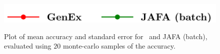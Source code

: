 \documentclass[letterpaper]{article}
\begin{document}
\begin{figure}[h]
    \centering
    \includegraphics[width=0.5\linewidth]{FIG/legend_errors.pdf}\\
 \hspace{0.5mm}
\hspace{0.5mm}
\hspace{0.5mm}
\caption{Plot of mean accuracy and standard error for \our\ and JAFA (batch), evaluated using $20$ monte-carlo samples of the accuracy.}%
\label{fig:error_bars}
\end{figure}
\end{document}
